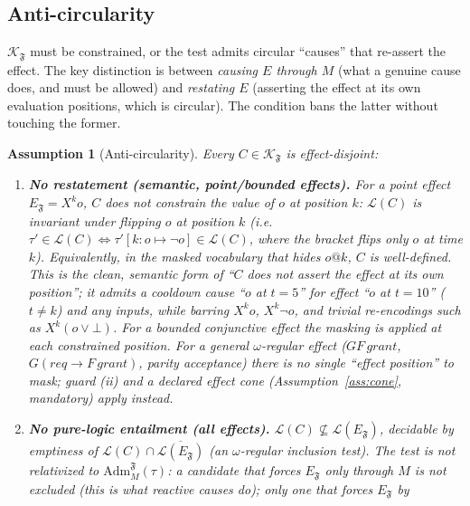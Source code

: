 \documentclass[11pt]{article}
\newtheorem{assumption}{Assumption}
\theoremstyle{remark}
\newcommand{\Lang}{\mathcal{L}}
\newcommand{\Frame}{\mathfrak{F}}
\newcommand{\Adm}{\mathrm{Adm}}
\begin{document}
\subsection{Anti-circularity}

\(\mathcal{K}_{\Frame}\) must be constrained, or the test admits circular
``causes'' that re-assert the effect. The key distinction is between
\emph{causing \(E\) through \(M\)} (what a genuine cause does, and must be allowed)
and \emph{restating \(E\)} (asserting the effect at its own evaluation positions,
which is circular). The condition bans the latter without touching the former.

\begin{assumption}[Anti-circularity]
\label{ass:anticirc}
Every \(C\in\mathcal{K}_{\Frame}\) is \emph{effect-disjoint}:
\begin{enumerate}[label=(\roman*)]
  \item \textbf{No restatement (semantic, point/bounded effects).} For a point
        effect \(E_{\Frame}=X^k o\), \(C\) does not constrain the value of \(o\) at
        position \(k\): \(\Lang(C)\) is invariant under flipping \(o\) at position
        \(k\) (i.e.\ \(\tau'\in\Lang(C)\iff\tau'[k{:}o{\mapsto}\neg o]\in\Lang(C)\),
        where the bracket flips only \(o\) at time \(k\)). Equivalently, in the
        masked vocabulary that hides \(o@k\), \(C\) is well-defined. This is the
        clean, semantic form of ``\(C\) does not assert the effect at its own
        position''; it admits a cooldown cause ``\(o\) at \(t=5\)'' for effect
        ``\(o\) at \(t=10\)'' (\(t\neq k\)) and any inputs, while barring
        \(X^k o\), \(X^k\neg o\), and trivial re-encodings such as
        \(X^k(o\lor\bot)\). For a bounded conjunctive effect the masking is applied
        at each constrained position. \emph{For a general \(\omega\)-regular
        effect} (\(GF\,grant\), \(G(req\to F\,grant)\), parity acceptance) there is
        no single ``effect position'' to mask; guard (ii) and a declared
        \emph{effect cone} (Assumption~\ref{ass:cone}, mandatory) apply instead.
  \item \textbf{No pure-logic entailment (all effects).} \(\Lang(C)\not\subseteq
        \Lang(E_{\Frame})\), decidable by emptiness of \(\Lang(C)\cap
        \overline{\Lang(E_{\Frame})}\) (an \(\omega\)-regular inclusion test). The
        test is \emph{not} relativized to \(\Adm_M^{\Frame}(\tau)\): a candidate
        that forces \(E_{\Frame}\) only \emph{through \(M\)} is \emph{not} excluded
        (this is what reactive causes do); only one that forces \(E_{\Frame}\) by

\end{enumerate}
\end{assumption}
\end{document}
